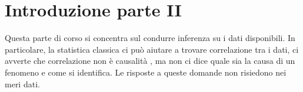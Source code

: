 \chapter{Introduzione parte II}
Questa parte di corso si concentra sul condurre inferenza su i dati disponibili.
In particolare, la statistica classica ci può aiutare a trovare correlazione tra i dati,
ci avverte che correlazione non è causalità
, ma non ci dice quale sia la causa di un fenomeno e come si identifica.
Le risposte a queste domande non risiedono nei meri dati.

